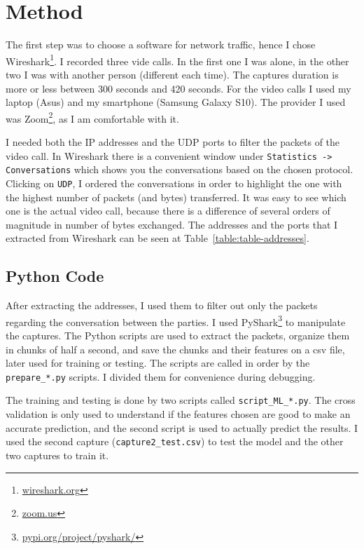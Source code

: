 \section{Method}

The first step was to choose a software for network traffic, hence I chose Wireshark\footnote{\href{https://www.wireshark.org/}{wireshark.org}}. I recorded three vide calls. In the first one I was alone, in the other two I was with another person (different each time). The captures duration is more or less between 300 seconds and 420 seconds. For the video calls I used my laptop (Asus) and my smartphone (Samsung Galaxy S10). The provider I used was Zoom\footnote{\href{https://zoom.us/}{zoom.us}}, as I am comfortable with it.

I needed both the IP addresses and the UDP ports to filter the packets of the video call. In Wireshark there is a convenient window under \texttt{Statistics -> Conversations} which shows you the conversations based on the chosen protocol. Clicking on \texttt{UDP}, I ordered the conversations in order to highlight the one with the highest number of packets (and bytes) transferred. It was easy to see which one is the actual video call, because there is a difference of several orders of magnitude in number of bytes exchanged. The addresses and the ports that I extracted from Wireshark can be seen at Table~\ref{table:table-addresses}.


\subsection{Python Code}
After extracting the addresses, I used them to filter out only the packets regarding the conversation between the parties. I used PyShark\footnote{\href{https://pypi.org/project/pyshark/}{pypi.org/project/pyshark/}} to manipulate the captures. The Python scripts are used to extract the packets, organize them in chunks of half a second, and save the chunks and their features on a csv file, later used for training or testing. The scripts are called in order by the \texttt{prepare\_*.py} scripts. I divided them for convenience during debugging.

The training and testing is done by two scripts called \texttt{script\_ML\_*.py}. The cross validation is only used to understand if the features chosen are good to make an accurate prediction, and the second script is used to actually predict the results. I used the second capture (\texttt{capture2\_test.csv}) to test the model and the other two captures to train it.

